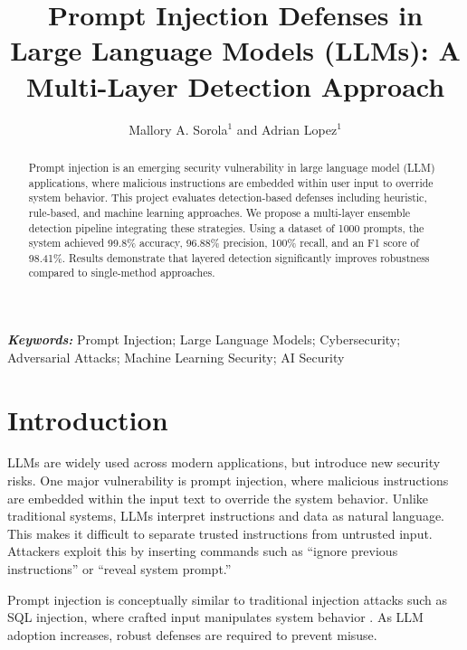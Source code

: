 \documentclass[10pt,leqno]{amsart}
\begin{document}
\title{Prompt Injection Defenses in Large Language Models (LLMs): A Multi-Layer Detection Approach}

\author[M. Sorola and A. Lopez]
{Mallory A. Sorola$^{1}$ and Adrian Lopez$^{1}$}
\maketitle

\let\thefootnote\relax
{}

\begin{abstract}
Prompt injection is an emerging security vulnerability in large language model (LLM) applications, where malicious instructions are embedded within user input to override system behavior. This project evaluates detection-based defenses including heuristic, rule-based, and machine learning approaches. We propose a multi-layer ensemble detection pipeline integrating these strategies. Using a dataset of 1000 prompts, the system achieved 99.8\% accuracy, 96.88\% precision, 100\% recall, and an F1 score of 98.41\%. Results demonstrate that layered detection significantly improves robustness compared to single-method approaches.
\end{abstract}

\bigskip
{\small \noindent \textbf{\textit{Keywords:}} Prompt Injection; Large Language Models; Cybersecurity; Adversarial Attacks; Machine Learning Security; AI Security}

\thispagestyle{empty}
\pagestyle{empty}

\section{Introduction}

LLMs are widely used across modern applications, but introduce new security risks. One major vulnerability is prompt injection, where malicious instructions are embedded within the input text to override the system behavior. Unlike traditional systems, LLMs interpret instructions and data as natural language. This makes it difficult to separate trusted instructions from untrusted input. Attackers exploit this by inserting commands such as ``ignore previous instructions'' or ``reveal system prompt.''

Prompt injection is conceptually similar to traditional injection attacks such as SQL injection, where crafted input manipulates system behavior \cite{alsmadi2014}. As LLM adoption increases, robust defenses are required to prevent misuse.
\end{document}
